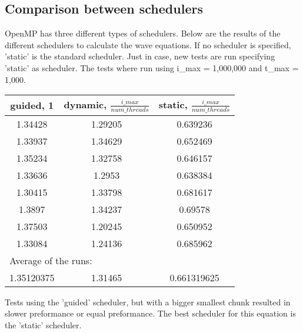 \documentclass[a4paper]{article}
\begin{document}
  \subsection{Comparison between schedulers}
    OpenMP has three different types of schedulers.
    Below are the results of the different
    schedulers to calculate the wave equations. 
    If no scheduler is specified, 'static' is the standard scheduler.
    Just in case, new tests are run specifying 'static' as scheduler.
    The tests where run using i\_max = 1,000,000 and t\_max = 1,000.
    \begin{center}
      \begin{tabular}{| c | c | c |}
      \hline
      guided, 1 & dynamic, $\frac{i\_max}{num\_threads}$ & static, $\frac{i\_max}{num\_threads}$\\
      \hline
      1.34428 & 1.29205 & 0.639236\\
      \hline
      1.33937 & 1.34629 & 0.652469\\
      \hline
      1.35234 & 1.32758 & 0.646157\\
      \hline
      1.33636 & 1.2953 & 0.638384\\
      \hline
      1.30415 & 1.33798 & 0.681617\\
      \hline
      1.3897 & 1.34237 & 0.69578\\
      \hline
      1.37503 & 1.20245 & 0.650952\\
      \hline
      1.33084 & 1.24136 & 0.685962\\
      \hline
      \multicolumn{3}{|l|}{Average of the runs:}\\
      \hline
      1.35120375 & 1.31465 & 0.661319625\\
      \hline
      \end{tabular}
    \end{center}
    Tests using the 'guided' scheduler, but with a bigger smallest chunk resulted
    in slower preformance or equal preformance. The best scheduler for this equation
    is the 'static' scheduler.
    
    
\end{document}

